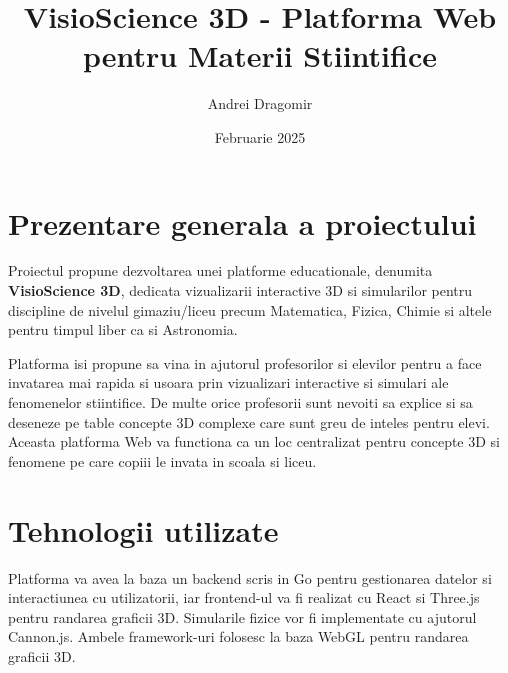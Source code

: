 \documentclass[a4paper,12pt]{article}
\title{VisioScience 3D - Platforma Web pentru Materii Stiintifice}
\author{Andrei Dragomir}
\date{Februarie 2025}
\begin{document}
\maketitle

\section*{Prezentare generala a proiectului}
Proiectul propune dezvoltarea unei platforme educationale, denumita \textbf{VisioScience 3D}, 
dedicata vizualizarii interactive 3D si simularilor pentru discipline de nivelul gimaziu/liceu
precum Matematica, Fizica, Chimie si altele pentru timpul liber ca si Astronomia.

Platforma isi propune sa vina in ajutorul profesorilor si elevilor pentru a face invatarea mai 
rapida si usoara prin vizualizari interactive si simulari ale fenomenelor stiintifice. De multe orice
profesorii sunt nevoiti sa explice si sa deseneze pe table concepte 3D complexe care sunt greu de
inteles pentru elevi. Aceasta platforma Web va functiona ca un loc centralizat pentru concepte 
3D si fenomene pe care copiii le invata in scoala si liceu.

\section*{Tehnologii utilizate}

Platforma va avea la baza un backend scris in Go pentru gestionarea datelor si interactiunea cu
utilizatorii, iar frontend-ul va fi realizat cu React si Three.js pentru randarea graficii 3D.
Simularile fizice vor fi implementate cu ajutorul Cannon.js. Ambele framework-uri folosesc la 
baza WebGL pentru randarea graficii 3D.
\end{document}
